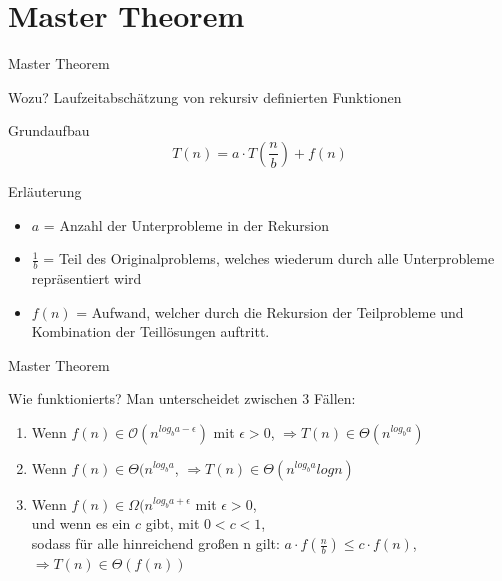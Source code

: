 	\section{Master Theorem}
	\begin{frame}{Master Theorem}
		\begin{block}{Wozu?}
			Laufzeitabschätzung von rekursiv definierten Funktionen
		\end{block}
		
		\pause
		\begin{block}{Grundaufbau}
			\[T(n) = a\cdot T(\frac{n}{b}) + f(n)\]
		\end{block}
		
		\pause
		\begin{block}{Erläuterung}
			\begin{itemize}
				\item $a$ = Anzahl der Unterprobleme in der Rekursion
				
				\pause
				\item $\frac{1}{b}$ = Teil des Originalproblems, welches wiederum durch alle Unterprobleme repräsentiert wird
				
				\pause
				\item $f(n)$ = Aufwand, welcher durch die Rekursion der Teilprobleme und Kombination der Teillösungen auftritt.
			\end{itemize}
		\end{block}
	\end{frame}
	
	
	\begin{frame}{Master Theorem}
		\begin{block}{Wie funktionierts?}
			Man unterscheidet zwischen 3 Fällen:
			\begin{enumerate}
				\pause
				\item Wenn $f(n) \in \mathcal{O}(n^{log_b a-\epsilon})$ mit $\epsilon > 0$, $\Rightarrow T(n) \in \Theta(n^{log_b a})$
				\vspace{10pt}
				
				\pause
				\item Wenn $f(n) \in \Theta(n^{log_b a}$, $\Rightarrow T(n) \in \Theta(n^{log_b a}log n)$
				\vspace{10pt}
				
				\pause
				\item Wenn $f(n) \in \Omega(n^{log_b a+\epsilon}$ mit $\epsilon > 0$, \\
				und wenn es ein $c$ gibt, mit $ 0 < c < 1$, \\
				sodass für alle hinreichend großen n gilt: $a\cdot f(\frac{n}{b}) \leq c \cdot f(n)$,\\
				$\Rightarrow T(n) \in \Theta(f(n))$
			\end{enumerate}
		\end{block}
	\end{frame}
	
